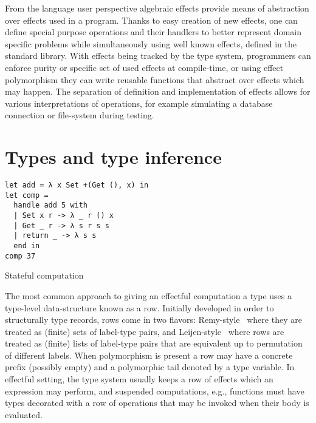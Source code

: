 \documentclass[inz, english, longabstract]{iithesis}
\begin{document}
From the language user perspective algebraic effects provide means of abstraction over effects used in a program.
Thanks to easy creation of new effects, one can define special purpose operations and their handlers to better represent domain specific problems while simultaneously using well known effects, defined in the standard library.
With effects being tracked by the type system, programmers can enforce purity or specific set of used effects at compile-time, or using effect polymorphism they can write reusable functions that abstract over effects which may happen.
The separation of definition and implementation of effects allows for various interpretations of operations, for example simulating a database connection or file-system during testing.

\section{Types and type inference}\label{sec:types}
\begin{listing}[t]
  \begin{verbatim}
let add = λ x Set +(Get (), x) in
let comp = 
  handle add 5 with
  | Set x r -> λ _ r () x
  | Get _ r -> λ s r s s
  | return _ -> λ s s
  end in
comp 37
  \end{verbatim}
  \caption{Stateful computation}
  \label{lst:stateful-computation}
\end{listing}
The most common approach to giving an effectful computation a type uses a type-level data-structure known as a row.
Initially developed in order to structurally type records, rows come in two flavors: Remy-style~\cite{Remy1994} where they are treated as (finite) sets of label-type pairs, and Leijen-style~\cite{Leijen2005} where rows are treated as (finite) lists of label-type pairs that are equivalent up to permutation of different labels.
When polymorphism is present a row may have a concrete prefix (possibly empty) and a polymorphic tail denoted by a type variable.
In effectful setting, the type system usually keeps a row of effects which an expression may perform, and suspended computations, e.g., functions must have types decorated with a row of operations that may be invoked when their body is evaluated.
\end{document}
